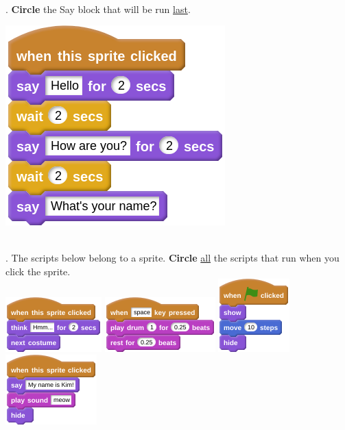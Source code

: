 \documentclass[letterpaper,12pt]{article}
\begin{document}
\noindent \dotfill \\

. \textbf{Circle} the Say block that will be run \underline{last}.  \\
\begin{center}
\includegraphics[scale=.4]{q2_script0.png}
\end{center}

\noindent \dotfill \\

. The scripts below belong to a sprite. \textbf{Circle} \underline{all} the scripts that run when you click the sprite. \\

\includegraphics[scale=1,valign=t]{q3_script0.png} \hspace{1cm}
\includegraphics[scale=1,valign=t]{q3_script1.png} \hspace{1cm}
\includegraphics[scale=1,valign=t]{q3_script2.png} \hspace{1cm}
\includegraphics[scale=1,valign=t]{q3_script3.png} \hspace{1cm}
\end{document}
